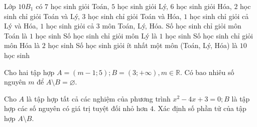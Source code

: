 \begin{ex}%
	Lớp $10 B_1$ có $7$ học  sinh giỏi Toán, $5$ học sinh giỏi Lý, $6$ học sinh giỏi Hóa, $2$ học sinh chỉ giỏi Toán và Lý, $3$ học sinh chỉ giỏi Toán và Hóa, $1$ học sinh chỉ giỏi cả Lý và Hóa, $1$ học sinh giỏi cả $3$ môn Toán, Lý, Hóa.
	\choiceTF 
		{\True Số  học sinh chỉ giỏi môn Toán là $1$ học sinh}
		{\True Số học sinh chỉ giỏi môn Lý là $1$  học sinh}
		{Số học sinh chỉ giỏi môn Hóa là  $2$ học sinh}
		{\True Số học sinh giỏi  ít nhất một môn (Toán, Lý, Hóa) là $10$ học sinh}
\end{ex}



\begin{bt}%
	Cho hai tập hợp $A=(m-1; 5); B=(3;+\infty), m \in \mathbb{R}$. Có bao  nhiêu số nguyên $m$ để $A\setminus B=\varnothing$.
\end{bt}

\begin{bt}%
	Cho $A$ là tập hợp tất cả các nghiệm của phương trình $x^2-4x+3=0; B$ là tập hợp các số nguyên có giá  trị tuyệt đối nhỏ hơn $4$. Xác định số phần tử của tập hợp $A\setminus B$.
\end{bt}

